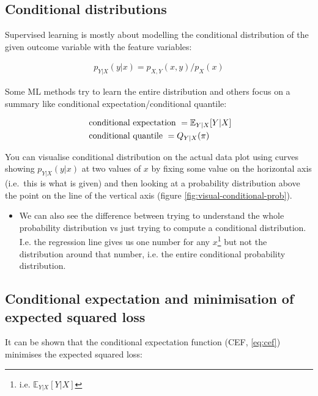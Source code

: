 \documentclass[
]{report}
\providecommand{\tightlist}{%
  \setlength{\itemsep}{0pt}\setlength{\parskip}{0pt}}
\theoremstyle{definition}
\theoremstyle{definition}
\theoremstyle{definition}
\theoremstyle{definition}
\theoremstyle{remark}
\begin{document}
\hypertarget{conditional-distributions}{%
\subsection{Conditional distributions}\label{conditional-distributions}}

Supervised learning is mostly about modelling the conditional distribution of
the given outcome variable with the feature variables:

\begin{align*}
  p_{Y|X}(y|x) =  p_{X,Y}(x,y) / p_{X}(x)
\end{align*}

Some ML methods try to learn the entire distribution and others focus on a
summary like conditional expectation/conditional quantile:

\begin{align}
  &\text{ conditional expectation } = \mathbb{E}_{Y|X}[Y|X] \label{eq:cef}\\
  &\text{ conditional quantile } = Q_{Y|X}(\pi) \notag
\end{align}

You can visualise conditional distribution on the actual data plot using curves
showing \(p_{Y|X}(y|x)\) at two values of \(x\) by fixing some value on the
horizontal axis (i.e.~this is what is given) and then looking at a probability
distribution above the point on the line of the vertical axis (figure
\ref{fig:visual-conditional-prob}).

\begin{itemize}
\tightlist
\item
  We can also see the difference between trying to understand the whole
  probability distribution vs just trying to compute a conditional
  distribution. I.e. the regression line gives us one number for any \(x\)\footnote{i.e.
    \(\mathbb{E}_{Y|X}[Y|X]\)} but not the distribution around that number, i.e.
  the entire conditional probability distribution.
\end{itemize}

\hypertarget{conditional-expectation-and-minimisation-of-expected-squared-loss}{%
\subsection{Conditional expectation and minimisation of expected squared loss}\label{conditional-expectation-and-minimisation-of-expected-squared-loss}}

It can be shown that the conditional expectation function (CEF, \eqref{eq:cef})
minimises the expected squared loss:
\end{document}
